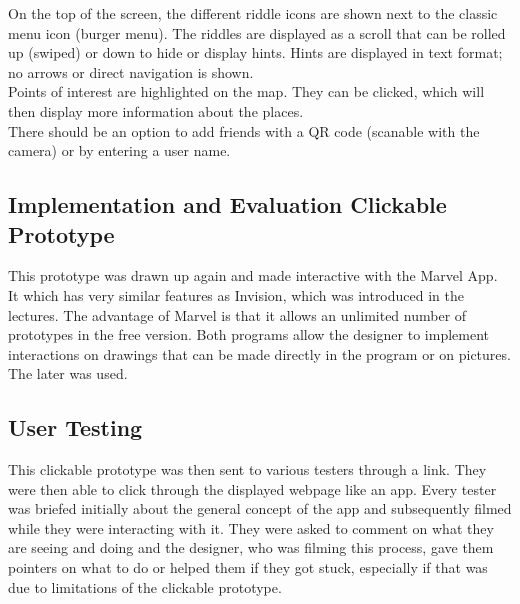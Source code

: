 \documentclass[10pt,twocolumn]{article} %
\begin{document}
On the top of the screen, the different riddle icons are shown next to the classic menu icon (burger menu). The riddles are displayed as a scroll that can be rolled up (swiped) or down to hide or display hints. Hints are displayed in text format; no arrows or direct navigation is shown.\\
Points of interest are highlighted on the map. They can be clicked, which will then display more information about the places.\\
There should be an option to add friends with a QR code (scanable with the camera) or by entering a user name. 

\subsection*{Implementation and Evaluation Clickable Prototype}
This prototype was drawn up again and made interactive with the Marvel App. It which has very similar features as Invision, which was introduced in the lectures. The advantage of Marvel is that it allows an unlimited number of prototypes in the free version. Both programs allow the designer to implement interactions on drawings that can be made directly in the program or on pictures. The later was used.


\subsection*{User Testing}

This clickable prototype was then sent to various testers through a link. They were then able to click through the displayed webpage like an app. Every tester was briefed initially about the general concept of the app and subsequently filmed while they were interacting with it. They were asked to comment on what they are seeing and doing and the designer, who was filming this process, gave them pointers on what to do or helped them if they got stuck, especially if that was due to limitations of the clickable prototype.

\end{document}
